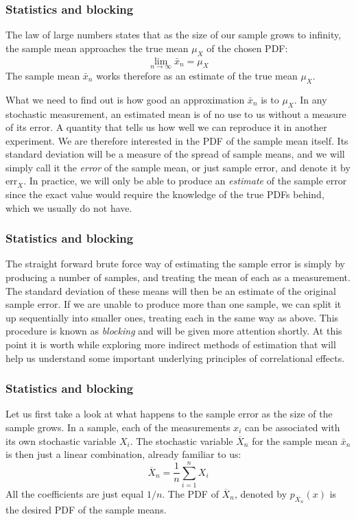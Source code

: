 \documentclass[compress]{beamer}
\newcommand{\bdm}{\begin{displaymath}}
\newcommand{\edm}{\end{displaymath}}
\begin{document}
\frame
{
  \frametitle{Statistics and blocking}
\begin{small}
{\scriptsize
The law of large numbers
states that as the size of our sample grows to infinity, the sample
mean approaches the true mean $\mu_X^{\phantom X}$ of the chosen PDF:
\bdm
\lim_{n\to\infty}\bar x_n = \mu_X^{\phantom X}
\edm
The sample mean $\bar x_n$ works therefore as an estimate of the true
mean $\mu_X^{\phantom X}$.

What we need to find out is how good an approximation $\bar x_n$ is to
$\mu_X^{\phantom X}$. In any stochastic measurement, an estimated
mean is of no use to us without a measure of its error. A quantity
that tells us how well we can reproduce it in another experiment. We
are therefore interested in the PDF of the sample mean itself. Its
standard deviation will be a measure of the spread of sample means,
and we will simply call it the \emph{error} of the sample mean, or
just sample error, and denote it by $\mathrm{err}_X^{\phantom X}$. In
practice, we will only be able to produce an \emph{estimate} of the
sample error since the exact value would require the knowledge of the
true PDFs behind, which we usually do not have.
}
\end{small}
}

\frame
{
  \frametitle{Statistics and blocking}
\begin{small}
{\scriptsize
The straight forward brute force way of estimating the sample error is
simply by producing a number of samples, and treating the mean of each
as a measurement. The standard deviation of these means will then be
an estimate of the original sample error. If we are unable to produce
more than one sample, we can split it up sequentially into smaller
ones, treating each in the same way as above. This procedure is known
as \emph{blocking} and will be given more attention shortly. At this
point it is worth while exploring more indirect methods of estimation
that will help us understand some important underlying principles of
correlational effects.
}
\end{small}
}

\frame
{
  \frametitle{Statistics and blocking}
\begin{small}
{\scriptsize
Let us first take a look at what happens to the sample error as the
size of the sample grows. In a sample, each of the measurements $x_i$
can be associated with its own stochastic variable $X_i$. The
stochastic variable $\overline X_n$ for the sample mean $\bar x_n$ is
then just a linear combination, already familiar to us:
\bdm
\overline X_n = \frac{1}{n}\sum_{i=1}^n X_i
\edm
All the coefficients are just equal $1/n$. The PDF of $\overline X_n$,
denoted by $p_{\overline X_n}(x)$ is the desired PDF of the sample
means. 
}
\end{small}
}
\end{document}
